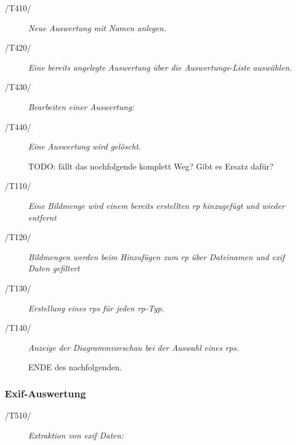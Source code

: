 		\begin{description}
		
			\item[/T410/] \textit{Neue Auswertung mit Namen anlegen.}\par
			
			\item[/T420/] \textit{Eine bereits angelegte Auswertung über die Auswertungs-Liste auswählen.}\par
			
			\item[/T430/] \textit{Bearbeiten einer Auswertung:}\par 
				
			\item[/T440/] \textit{Eine Auswertung wird gelöscht.}\par
			
			TODO: fällt das nochfolgende komplett Weg? Gibt es Ersatz dafür?
			\item[/T110/] \textit{Eine Bildmenge wird einem bereits erstellten \gls{rp} hinzugefügt und wieder entfernt}\par
				
			\item[/T120/] \textit{Bildmengen werden beim Hinzufügen zum \gls{rp} über Dateinamen und \gls{exif} Daten gefiltert}\par
				
			\item[/T130/] \textit{Erstellung eines \gls{rp}s für jeden \gls{rp}-Typ.}\par
			
			\item[/T140/] \textit{Anzeige der Diagrammvorschau bei der Auswahl eines \gls{rp}s. }\par
			ENDE des nachfolgenden.
				
		\end{description}
	
	\subsubsection{Exif-Auswertung}
	
		\begin{description}

			\item[/T510/] \textit{Extraktion von \gls{exif} Daten:}\par 

		\end{description}
	
